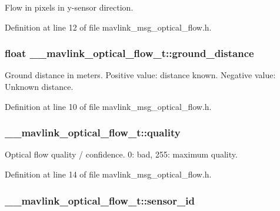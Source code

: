 Flow in pixels in y-\/sensor direction. 



Definition at line 12 of file mavlink\-\_\-msg\-\_\-optical\-\_\-flow.\-h.

\hypertarget{struct____mavlink__optical__flow__t_a89b39010e211494ffecc65c29fdd8c0e}{
\subsubsection[{ground\-\_\-distance}]{\setlength{\rightskip}{0pt plus 5cm}float \-\_\-\-\_\-mavlink\-\_\-optical\-\_\-flow\-\_\-t\-::ground\-\_\-distance}}\label{struct____mavlink__optical__flow__t_a89b39010e211494ffecc65c29fdd8c0e}


Ground distance in meters. Positive value\-: distance known. Negative value\-: Unknown distance. 



Definition at line 10 of file mavlink\-\_\-msg\-\_\-optical\-\_\-flow.\-h.

\hypertarget{struct____mavlink__optical__flow__t_a3efb901fe9c47c88f90ddfb73d76f542}{
\subsubsection[{quality}]{ \-\_\-\-\_\-mavlink\-\_\-optical\-\_\-flow\-\_\-t\-::quality}}\label{struct____mavlink__optical__flow__t_a3efb901fe9c47c88f90ddfb73d76f542}


Optical flow quality / confidence. 0\-: bad, 255\-: maximum quality. 



Definition at line 14 of file mavlink\-\_\-msg\-\_\-optical\-\_\-flow.\-h.

\hypertarget{struct____mavlink__optical__flow__t_a196e345c474b8fc63570ebad5f947544}{
\subsubsection[{sensor\-\_\-id}]{ \-\_\-\-\_\-mavlink\-\_\-optical\-\_\-flow\-\_\-t\-::sensor\-\_\-id}}\label{struct____mavlink__optical__flow__t_a196e345c474b8fc63570ebad5f947544}


